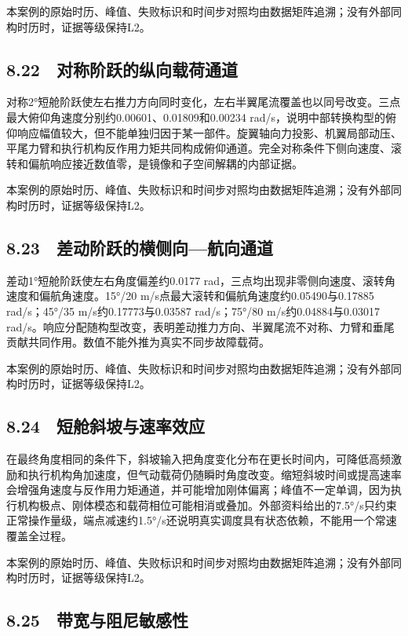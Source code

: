\documentclass[UTF8,12pt,openany]{ctexbook}
\begin{document}
本案例的原始时历、峰值、失败标识和时间步对照均由数据矩阵追溯；没有外部同构时历时，证据等级保持L2。

\subsection{8.22　对称阶跃的纵向载荷通道}

对称2°短舱阶跃使左右推力方向同时变化，左右半翼尾流覆盖也以同号改变。三点最大俯仰角速度分别约0.00601、0.01809和0.00234 rad/s，说明中部转换构型的俯仰响应幅值较大，但不能单独归因于某一部件。旋翼轴向力投影、机翼局部动压、平尾力臂和执行机构反作用力矩共同构成俯仰通道。完全对称条件下侧向速度、滚转和偏航响应接近数值零，是镜像和子空间解耦的内部证据。

本案例的原始时历、峰值、失败标识和时间步对照均由数据矩阵追溯；没有外部同构时历时，证据等级保持L2。

\subsection{8.23　差动阶跃的横侧向—航向通道}

差动1°短舱阶跃使左右角度偏差约0.0177 rad，三点均出现非零侧向速度、滚转角速度和偏航角速度。15°/20 m/s点最大滚转和偏航角速度约0.05490与0.17885 rad/s；45°/35 m/s约0.17773与0.03587 rad/s；75°/80 m/s约0.04884与0.03017 rad/s。响应分配随构型改变，表明差动推力方向、半翼尾流不对称、力臂和垂尾贡献共同作用。数值不能外推为真实不同步故障载荷。

本案例的原始时历、峰值、失败标识和时间步对照均由数据矩阵追溯；没有外部同构时历时，证据等级保持L2。

\subsection{8.24　短舱斜坡与速率效应}

在最终角度相同的条件下，斜坡输入把角度变化分布在更长时间内，可降低高频激励和执行机构角加速度，但气动载荷仍随瞬时角度改变。缩短斜坡时间或提高速率会增强角速度与反作用力矩通道，并可能增加刚体偏离；峰值不一定单调，因为执行机构极点、刚体模态和载荷相位可能相消或叠加。外部资料给出的7.5°/s只约束正常操作量级，端点减速约1.5°/s还说明真实调度具有状态依赖，不能用一个常速覆盖全过程。

本案例的原始时历、峰值、失败标识和时间步对照均由数据矩阵追溯；没有外部同构时历时，证据等级保持L2。

\subsection{8.25　带宽与阻尼敏感性}
\end{document}
